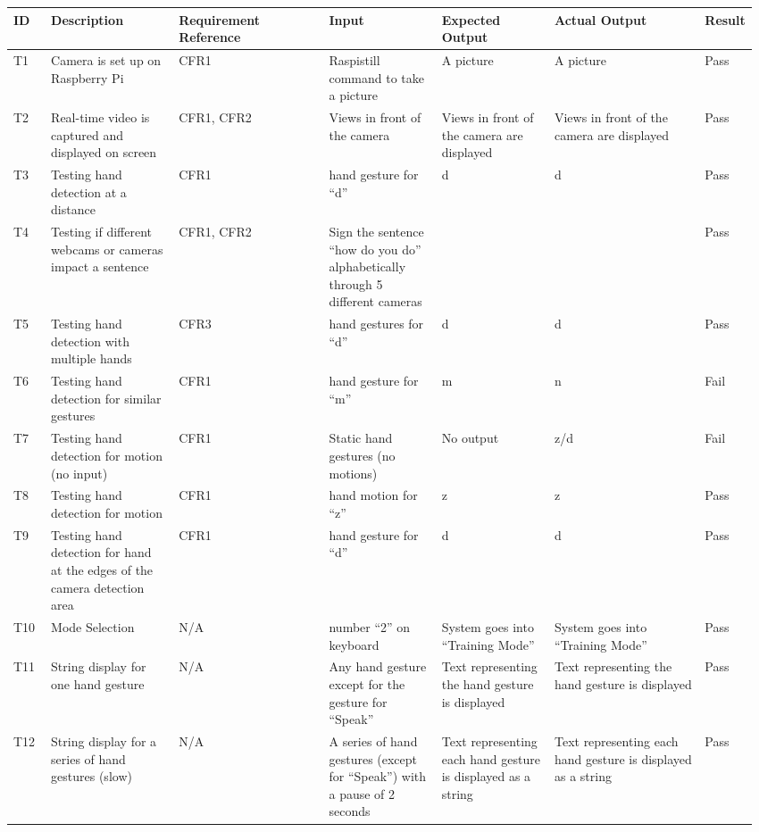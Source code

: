 \documentclass[12pt, titlepage]{article}
\begin{document}
\begin{landscape}
\renewcommand{\arraystretch}{1.2}
\noindent \begin{longtable}{p{0.05\linewidth}|p{0.17\linewidth}|p{0.2\linewidth}|p{0.15\linewidth}|p{0.15\linewidth}|p{0.2\linewidth}|p{0.05\linewidth}}
\hline
\textbf{ID} & \textbf{Description} & \textbf{Requirement Reference} & \textbf{Input} & \textbf{Expected Output} & \textbf{Actual Output} & \textbf{Result}\\
\hline
T1 & Camera is set up on Raspberry Pi & CFR1 & Raspistill command to take a picture & A picture & A picture & Pass\\ \hline
T2 & Real-time video is captured and displayed on screen & CFR1, CFR2 & Views in front of the camera & Views in front of the camera are displayed & Views in front of the camera are displayed & Pass\\ \hline
T3 & Testing hand detection at a distance & CFR1 & hand gesture for “d” & d & d & Pass\\ \hline
T4 & Testing if different webcams or cameras impact a sentence & CFR1, CFR2 & Sign the sentence “how do you do” alphabetically through 5 different cameras & & & Pass\\ \hline
T5 & Testing hand detection with multiple hands & CFR3 & hand gestures for “d” & d & d & Pass\\ \hline
T6 & Testing hand detection for similar gestures & CFR1 & hand gesture for “m” & m & n & Fail\\ \hline
T7 & Testing hand detection for motion (no input) & CFR1 & Static hand gestures (no motions) & No output & z/d & Fail\\ \hline
T8 & Testing hand detection for motion & CFR1 & hand motion for “z” & z & z & Pass\\ \hline
T9 & Testing hand detection for hand at the edges of the camera detection area & CFR1 & hand gesture for “d” & d & d & Pass\\ \hline
T10 & Mode Selection & N/A & number “2” on keyboard & System goes into “Training Mode” & System goes into “Training Mode” & Pass\\ \hline
T11 & String display for one hand gesture & N/A & Any hand gesture except for the gesture for “Speak” & Text representing the hand gesture is displayed & Text representing the hand gesture is displayed & Pass\\ \hline
T12 & String display for a series of hand gestures (slow) & N/A & A series of hand gestures (except for “Speak”) with a pause of 2 seconds & Text representing each hand gesture is displayed as a string & Text representing each hand gesture is displayed as a string & Pass\\ \hline

\end{longtable}
\end{landscape}
\end{document}
